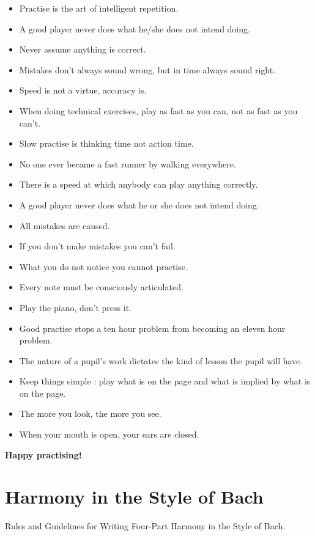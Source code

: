 \documentclass{article}
\begin{document}
\begin{itemize}
    \item Practise is the art of intelligent repetition.
    \item A good player never does what he/she does not intend doing.
    \item Never assume anything is correct.
    \item Mistakes don't always sound wrong, but in time always sound right.
    \item Speed is not a virtue, accuracy is.
    \item When doing technical exercises, play as fast as you can, not as fast as you can't.
    \item Slow practise is thinking time not action time.
    \item No one ever became a fast runner by walking everywhere.
    \item There is a speed at which anybody can play anything correctly.
    \item A good player never does what he or she does not intend doing.
    \item All mistakes are caused.
    \item If you don't make mistakes you can't fail.
    \item What you do not notice you cannot practise.
    \item Every note must be consciously articulated.
    \item Play the piano, don't press it.
    \item Good practise stops a ten hour problem from becoming an eleven hour problem.
    \item The nature of a pupil's work dictates the kind of lesson the pupil will have.
    \item Keep things simple : play what is on the page and what is implied by what is on the page.
    \item The more you look, the more you see.
    \item When your mouth is open, your ears are closed.
\end{itemize}

\textbf{Happy practising!}

\newpage
\section{Harmony in the Style of Bach}

Rules and Guidelines for Writing Four-Part Harmony in the Style of Bach.
\end{document}
